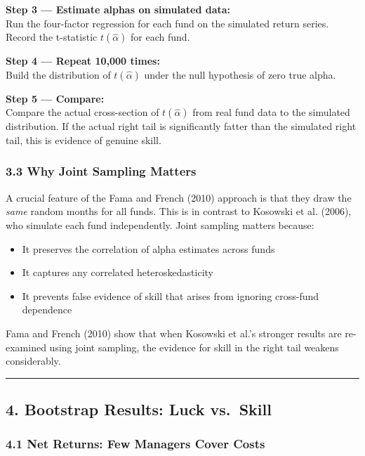 \documentclass[
  letterpaper,
  DIV=11,
  numbers=noendperiod]{scrartcl}
\providecommand{\tightlist}{%
  \setlength{\itemsep}{0pt}\setlength{\parskip}{0pt}}
\begin{document}
\textbf{Step 3 --- Estimate alphas on simulated data:}\\
Run the four-factor regression for each fund on the simulated return
series. Record the t-statistic \(t(\hat{\alpha})\) for each fund.

\textbf{Step 4 --- Repeat 10,000 times:}\\
Build the distribution of \(t(\hat{\alpha})\) under the null hypothesis
of zero true alpha.

\textbf{Step 5 --- Compare:}\\
Compare the actual cross-section of \(t(\hat{\alpha})\) from real fund
data to the simulated distribution. If the actual right tail is
significantly fatter than the simulated right tail, this is evidence of
genuine skill.

\subsubsection{3.3 Why Joint Sampling
Matters}\label{why-joint-sampling-matters}

A crucial feature of the Fama and French (2010) approach is that they
draw the \emph{same} random months for all funds. This is in contrast to
Kosowski et al. (2006), who simulate each fund independently. Joint
sampling matters because:

\begin{itemize}
\tightlist
\item
  It preserves the correlation of alpha estimates across funds
\item
  It captures any correlated heteroskedasticity
\item
  It prevents false evidence of skill that arises from ignoring
  cross-fund dependence
\end{itemize}

Fama and French (2010) show that when Kosowski et al.'s stronger results
are re-examined using joint sampling, the evidence for skill in the
right tail weakens considerably.

\begin{center}\rule{0.5\linewidth}{0.5pt}\end{center}

\subsection{4. Bootstrap Results: Luck
vs.~Skill}\label{bootstrap-results-luck-vs.-skill}

\subsubsection{4.1 Net Returns: Few Managers Cover
Costs}\label{net-returns-few-managers-cover-costs}
\end{document}
